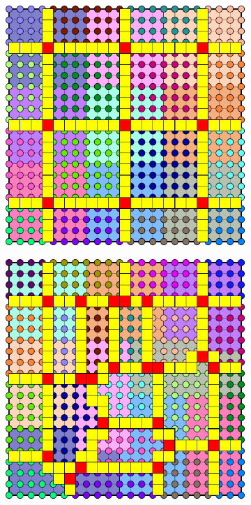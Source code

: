 \begin{figure}[htbp]
  \begin{subfigure}[t]{0.3\textwidth}
    \centerline{\includegraphics[width=0.9\linewidth]{figs/square_cart_struct_cell_dual_nomerge}}
  \end{subfigure}
  \hfill
  \begin{subfigure}[t]{0.3\textwidth}
    \centerline{\includegraphics[width=0.9\linewidth]{figs/square_cart_metis_cell_dual_nomerge}}

\end{subfigure}
\end{figure}
